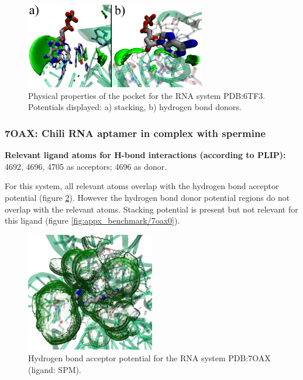       \begin{figure}[H]
        \centering
        \includegraphics[width=0.7\textwidth]{figures/results/benchmark_rna/6tf3.png}
        \caption{\label{fig:benchmark/6tf3} Physical properties of the pocket for the RNA system PDB:6TF3. Potentials displayed: a) stacking, b) hydrogen bond donors.}
      \end{figure}
    \pagebreak

    \subsubsection{7OAX: Chili RNA aptamer in complex with spermine}
      \textbf{Relevant ligand atoms for H-bond interactions (according to PLIP):} 4692, 4696, 4705 as acceptors; 4696 as donor.

      For this system, all relevant atoms overlap with the hydrogen bond acceptor potential (figure \ref{fig:benchmark/7oax0}). However the hydrogen bond donor potential regions do not overlap with the relevant atoms. Stacking potential is present but not relevant for this ligand (figure \ref{fig:appx_benchmark/7oax0}).

      \begin{figure}[H]
        \centering
        \includegraphics[width=0.5\textwidth]{figures/results/benchmark_rna/7oax0.png}
        \caption{\label{fig:benchmark/7oax0} Hydrogen bond acceptor potential for the RNA system PDB:7OAX (ligand: SPM).}
      \end{figure}
    \pagebreak

